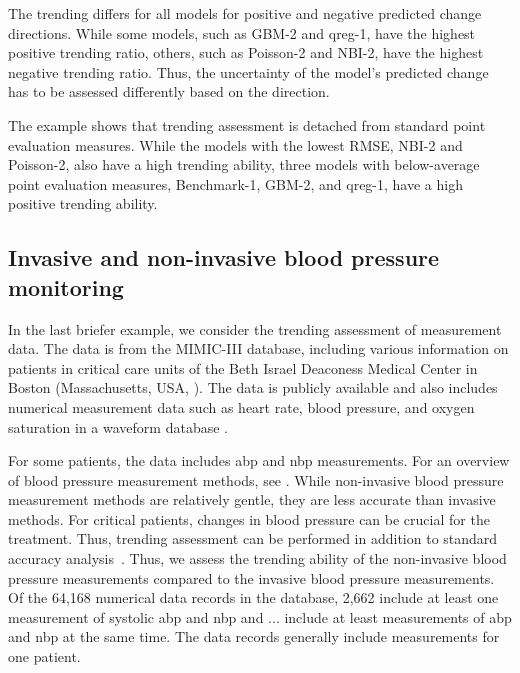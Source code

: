 The trending differs for all models for positive and negative predicted change directions.
While some models, such as GBM-2 and qreg-1, have the highest positive trending ratio, others, such as Poisson-2 and NBI-2, have the highest negative trending ratio.
Thus, the uncertainty of the model's predicted change has to be assessed differently based on the direction.

The example shows that trending assessment is detached from standard point evaluation measures.
While the models with the lowest RMSE, NBI-2 and Poisson-2, also have a high trending ability, three models with below-average point evaluation measures, Benchmark-1, GBM-2, and qreg-1, have a high positive trending ability.


\subsection{Invasive and non-invasive blood pressure monitoring} \label{sec:application_measurement}

In the last briefer example, we consider the trending assessment of measurement data.
The data is from the MIMIC-III database, including various information on patients in critical care units of the Beth Israel Deaconess Medical Center in Boston (Massachusetts, USA, \cite{Johnson2016}).
The data is publicly available and also includes numerical measurement data such as heart rate, blood pressure, and oxygen saturation in a waveform database \parencites[][]{Moody2017}[available through][]{Goldberger2000}.

For some patients, the data includes \ac{abp} and \ac{nbp} measurements.
For an overview of blood pressure measurement methods, see \textcite{Saugel2014}.
While non-invasive blood pressure measurement methods are relatively gentle, they are less accurate than invasive methods.
For critical patients, changes in blood pressure can be crucial for the treatment.
Thus, trending assessment can be performed in addition to standard accuracy analysis~\parencite[see, e.g., ]{Mostafa2020}.
Thus, we assess the trending ability of the non-invasive blood pressure measurements compared to the invasive blood pressure measurements.
Of the 64,168 numerical data records in the database, 2,662 include at least one measurement of systolic \ac{abp} and \ac{nbp} and ... include at least measurements of \ac{abp} and \ac{nbp} at the same time.
The data records generally include measurements for one patient.


